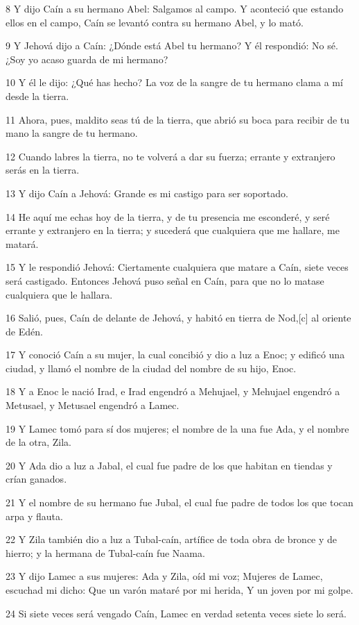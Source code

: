 8 Y dijo Caín a su hermano Abel: Salgamos al campo. Y aconteció que estando ellos en el campo, Caín se levantó contra su hermano Abel, y lo mató.

9 Y Jehová dijo a Caín: ¿Dónde está Abel tu hermano? Y él respondió: No sé. ¿Soy yo acaso guarda de mi hermano?

10 Y él le dijo: ¿Qué has hecho? La voz de la sangre de tu hermano clama a mí desde la tierra.

11 Ahora, pues, maldito seas tú de la tierra, que abrió su boca para recibir de tu mano la sangre de tu hermano.

12 Cuando labres la tierra, no te volverá a dar su fuerza; errante y extranjero serás en la tierra.

13 Y dijo Caín a Jehová: Grande es mi castigo para ser soportado.

14 He aquí me echas hoy de la tierra, y de tu presencia me esconderé, y seré errante y extranjero en la tierra; y sucederá que cualquiera que me hallare, me matará.

15 Y le respondió Jehová: Ciertamente cualquiera que matare a Caín, siete veces será castigado. Entonces Jehová puso señal en Caín, para que no lo matase cualquiera que le hallara.

16 Salió, pues, Caín de delante de Jehová, y habitó en tierra de Nod,[c] al oriente de Edén.

17 Y conoció Caín a su mujer, la cual concibió y dio a luz a Enoc; y edificó una ciudad, y llamó el nombre de la ciudad del nombre de su hijo, Enoc.

18 Y a Enoc le nació Irad, e Irad engendró a Mehujael, y Mehujael engendró a Metusael, y Metusael engendró a Lamec.

19 Y Lamec tomó para sí dos mujeres; el nombre de la una fue Ada, y el nombre de la otra, Zila.

20 Y Ada dio a luz a Jabal, el cual fue padre de los que habitan en tiendas y crían ganados.

21 Y el nombre de su hermano fue Jubal, el cual fue padre de todos los que tocan arpa y flauta.

22 Y Zila también dio a luz a Tubal-caín, artífice de toda obra de bronce y de hierro; y la hermana de Tubal-caín fue Naama.

23 Y dijo Lamec a sus mujeres:
    Ada y Zila, oíd mi voz;
    Mujeres de Lamec, escuchad mi dicho:
    Que un varón mataré por mi herida,
    Y un joven por mi golpe.

24 Si siete veces será vengado Caín,
Lamec en verdad setenta veces siete lo será.

